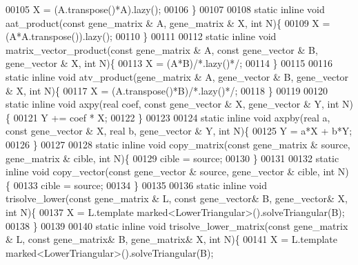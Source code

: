 \begin{DoxyCode}
00105     X = (A.transpose()*A).lazy();
00106   \}
00107 
00108   \textcolor{keyword}{static} \textcolor{keyword}{inline} \textcolor{keywordtype}{void} aat\_product(\textcolor{keyword}{const} gene\_matrix & A, gene\_matrix & X, \textcolor{keywordtype}{int} N)\{
00109     X = (A*A.transpose()).lazy();
00110   \}
00111 
00112   \textcolor{keyword}{static} \textcolor{keyword}{inline} \textcolor{keywordtype}{void} matrix\_vector\_product(\textcolor{keyword}{const} gene\_matrix & A, \textcolor{keyword}{const} gene\_vector & B, gene\_vector & X, \textcolor{keywordtype}{
      int} N)\{
00113     X = (A*B)\textcolor{comment}{/*.lazy()*/};
00114   \}
00115 
00116   \textcolor{keyword}{static} \textcolor{keyword}{inline} \textcolor{keywordtype}{void} atv\_product(gene\_matrix & A, gene\_vector & B, gene\_vector & X, \textcolor{keywordtype}{int} N)\{
00117     X = (A.transpose()*B)\textcolor{comment}{/*.lazy()*/};
00118   \}
00119 
00120   \textcolor{keyword}{static} \textcolor{keyword}{inline} \textcolor{keywordtype}{void} axpy(real coef, \textcolor{keyword}{const} gene\_vector & X, gene\_vector & Y, \textcolor{keywordtype}{int} N)\{
00121     Y += coef * X;
00122   \}
00123 
00124   \textcolor{keyword}{static} \textcolor{keyword}{inline} \textcolor{keywordtype}{void} axpby(real a, \textcolor{keyword}{const} gene\_vector & X, real b, gene\_vector & Y, \textcolor{keywordtype}{int} N)\{
00125     Y = a*X + b*Y;
00126   \}
00127 
00128   \textcolor{keyword}{static} \textcolor{keyword}{inline} \textcolor{keywordtype}{void} copy\_matrix(\textcolor{keyword}{const} gene\_matrix & source, gene\_matrix & cible, \textcolor{keywordtype}{int} N)\{
00129     cible = source;
00130   \}
00131 
00132   \textcolor{keyword}{static} \textcolor{keyword}{inline} \textcolor{keywordtype}{void} copy\_vector(\textcolor{keyword}{const} gene\_vector & source, gene\_vector & cible, \textcolor{keywordtype}{int} N)\{
00133     cible = source;
00134   \}
00135 
00136   \textcolor{keyword}{static} \textcolor{keyword}{inline} \textcolor{keywordtype}{void} trisolve\_lower(\textcolor{keyword}{const} gene\_matrix & L, \textcolor{keyword}{const} gene\_vector& B, gene\_vector& X, \textcolor{keywordtype}{int} N)\{
00137     X = L.template marked<LowerTriangular>().solveTriangular(B);
00138   \}
00139 
00140   \textcolor{keyword}{static} \textcolor{keyword}{inline} \textcolor{keywordtype}{void} trisolve\_lower\_matrix(\textcolor{keyword}{const} gene\_matrix & L, \textcolor{keyword}{const} gene\_matrix& B, gene\_matrix& X, \textcolor{keywordtype}{int}
       N)\{
00141     X = L.template marked<LowerTriangular>().solveTriangular(B);

\end{DoxyCode}
